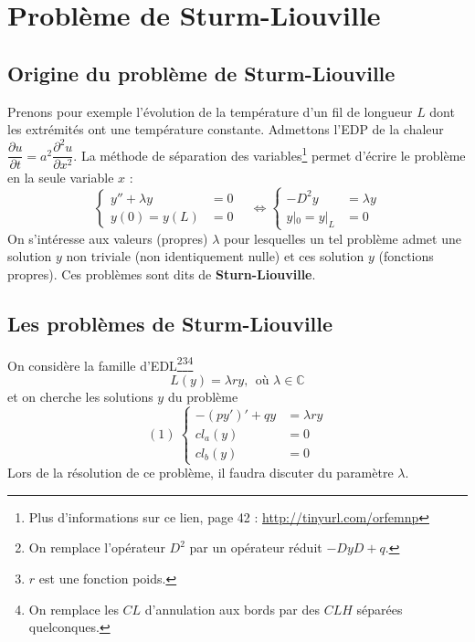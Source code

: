 \documentclass	[11pt, a4paper, openany]{book}
\begin{document}
\newpage
\section{Problème de Sturm-Liouville}
\subsection{Origine du problème de Sturm-Liouville}
Prenons pour exemple l'évolution de la température d'un fil de longueur $L$ dont les extrémités ont une température constante. Admettons l'EDP de la chaleur $\dfrac{\partial u}{\partial t} = a^2\dfrac{\partial^2u}{\partial x^2}$. La méthode de séparation des variables\footnote{Plus d'informations sur ce lien, page 42 : \url{http://tinyurl.com/orfemnp}} permet d'écrire le problème en la seule variable $x$ : 
\begin{equation}
\left\{\begin{array}{ll}
y''+\lambda y &=0\\
y(0)=y(L) &=0
\end{array}\right.\ \ \ \ \Leftrightarrow
\left\{\begin{array}{ll}
-D^2y &= \lambda y\\
y|_0 = y|_L &= 0
\end{array}\right.
\end{equation}
On s'intéresse aux valeurs (propres) $\lambda$ pour lesquelles un tel problème admet une solution $y$ non triviale (non identiquement nulle) et ces solution $y$ (fonctions propres). Ces problèmes sont dits de \textbf{Sturn-Liouville}.


\subsection{Les problèmes de Sturm-Liouville}
On considère la famille d'EDL\footnote{On remplace l'opérateur $D^2$ par un opérateur réduit $-DyD+q$.}\footnote{$r$ est une fonction poids. }\footnote{On remplace les $CL$ d'annulation aux bords par des $CLH$ séparées quelconques.}
\begin{equation}
L(y) = \lambda ry,\ \ \text{où } \lambda \in \mathbb{C}
\end{equation}
et on cherche les solutions $y$ du problème
\begin{equation}
(1)\ \left\{\begin{array}{ll}
-(py')' + qy &= \lambda r y\\
cl_a(y) &= 0\\
cl_b(y) &= 0
\end{array}\right.
\end{equation}
Lors de la résolution de ce problème, il faudra discuter du paramètre $\lambda$.\\
\end{document}
